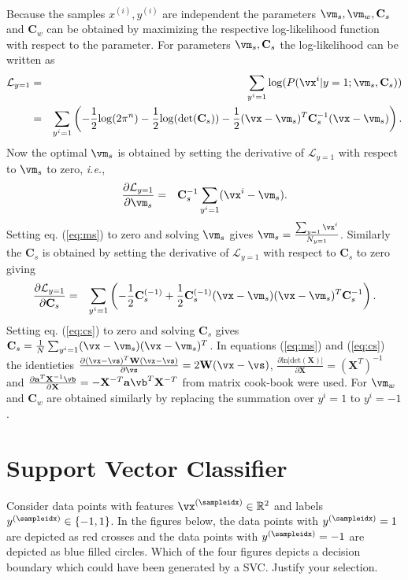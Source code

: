 \documentclass[article,11pt]{article}
\begin{document}
\\
Because the samples ${x^{(i)}, y^{(i)}}$ are independent the parameters $\vm_s, \vm_w, \mathbf{C}_s $ and $\mathbf{C}_w$ can be obtained by
maximizing the respective log-likelihood function with respect to the parameter. For parameters $\vm_s, \mathbf{C}_s $ the log-likelihood
can be written as
\begin{eqnarray}
  \mathcal{L}_{y=1}&=&\sum_{y^i=1}\mathrm{log}(P(\vx^i|y=1;\vm_s,\mathbf{C}_s))\nonumber\\
  &=&\sum_{y^i=1}\left(-\frac{1}{2}\mathrm{log}(2\pi^n)-\frac{1}{2}\mathrm{log}(\mathrm{det}(\mathbf{C}_s))-\frac{1}{2}(\vx-\vm_s)^T\mathbf{C}_s^{-1}(\vx-\vm_s)\right).
\end{eqnarray}
Now the optimal $\vm_s$ is obtained by setting the derivative of $\mathcal{L}_{y=1}$ with respect to $\vm_s$ to zero, \textit{i.e.},
\begin{eqnarray}
  \frac{\partial{\mathcal{L}_{y=1}}}{\partial\vm_s}&=&\mathbf{C}_s^{-1}\sum_{y^i=1}(\vx^i-\vm_s).
  \label{eq:ms}
\end{eqnarray}
Setting eq. (\ref{eq:ms}) to zero and solving $\vm_s$ gives $\vm_s=\frac{\sum_{y=1}\vx^i}{N_{y=1}}$. Similarly the
$\mathbf{C}_s$ is obtained  by setting the derivative of $\mathcal{L}_{y=1}$ with respect to $\mathbf{C}_s$ to zero giving
\begin{eqnarray}
  \frac{\partial{\mathcal{L}_{y=1}}}{\partial\mathbf{C}_s}&=&\sum_{y^i=1}\left(-\frac{1}{2}\mathbf{C}_s^{(-1)}+\frac{1}{2}\mathbf{C}_s^{(-1)}(\vx-\vm_s)(\vx-\vm_s)^T\mathbf{C}_s^{-1}\right).
  \label{eq:cs}
\end{eqnarray}
Setting eq. (\ref{eq:cs}) to zero and solving $\mathbf{C}_s$ gives $\mathbf{C}_s=\frac{1}{N}\sum_{y^i=1}(\vx-\vm_s)(\vx-\vm_s)^T$. In equations
(\ref{eq:ms}) and (\ref{eq:cs}) the identieties $\frac{\partial(\vx-\vs)^T\mathbf{W}(\vx-\vs)}{\partial\vs} = 2\mathbf{W}(\vx-\vs)$, $\frac{\partial\mathrm{ln}|\mathrm{det}(\mathbf{X})|}{\partial\mathbf{X}}=(\mathbf{X}^T)^{-1}$ and  $\frac{\partial\mathbf{a}^T\mathbf{X}^{-1}\vb}{\partial\mathbf{X}}=-\mathbf{X}^{-T}\mathbf{a}\vb^T\mathbf{X}^{-T}$ from matrix cook-book were used. For $\vm_w$ and $\mathbf{C}_w$ are obtained similarly by replacing the summation over $y^i=1$ to $y^i=-1$.


\newpage
\section{Support Vector Classifier}
Consider data points with features $\vx^{(\sampleidx)} \in \mathbb{R}^{2}$ and labels $y^{(\sampleidx)} \in \{-1,1\}$. 
In the figures below, the data points with $y^{(\sampleidx)}=1$ are depicted as red crosses 
and the data points with  $y^{(\sampleidx)}=-1$ are depicted as blue filled circles. 
Which of the four figures depicts a decision boundary which could have been generated by a SVC. Justify your selection.
	
\end{document}
